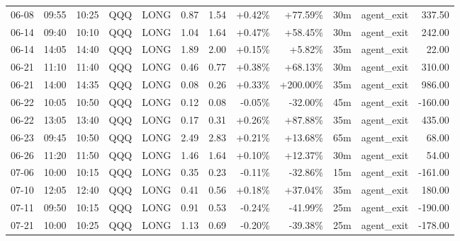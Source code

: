 \documentclass[11pt,a4paper,twoside]{article}
\begin{document}
\begin{center}
\begin{longtable}{>{\color{txtmain}}l l l l l r r r r r >{\color{txtmain}}l r}
06-08 & 09:55 & 10:25 & QQQ & LONG & 0.87 & 1.54 & \textcolor{wingreen}{+0.42\%} & \textcolor{wingreen}{+77.59\%} & 30m & agent\_exit & \textcolor{wingreen}{337.50} \\
06-14 & 09:40 & 10:10 & QQQ & LONG & 1.04 & 1.64 & \textcolor{wingreen}{+0.47\%} & \textcolor{wingreen}{+58.45\%} & 30m & agent\_exit & \textcolor{wingreen}{242.00} \\
06-14 & 14:05 & 14:40 & QQQ & LONG & 1.89 & 2.00 & \textcolor{wingreen}{+0.15\%} & \textcolor{wingreen}{+5.82\%} & 35m & agent\_exit & \textcolor{wingreen}{22.00} \\
06-21 & 11:10 & 11:40 & QQQ & LONG & 0.46 & 0.77 & \textcolor{wingreen}{+0.38\%} & \textcolor{wingreen}{+68.13\%} & 30m & agent\_exit & \textcolor{wingreen}{310.00} \\
06-21 & 14:00 & 14:35 & QQQ & LONG & 0.08 & 0.26 & \textcolor{wingreen}{+0.33\%} & \textcolor{wingreen}{+200.00\%} & 35m & agent\_exit & \textcolor{wingreen}{986.00} \\
06-22 & 10:05 & 10:50 & QQQ & LONG & 0.12 & 0.08 & \textcolor{lossred}{-0.05\%} & \textcolor{lossred}{-32.00\%} & 45m & agent\_exit & \textcolor{lossred}{-160.00} \\
06-22 & 13:05 & 13:40 & QQQ & LONG & 0.17 & 0.31 & \textcolor{wingreen}{+0.26\%} & \textcolor{wingreen}{+87.88\%} & 35m & agent\_exit & \textcolor{wingreen}{435.00} \\
06-23 & 09:45 & 10:50 & QQQ & LONG & 2.49 & 2.83 & \textcolor{wingreen}{+0.21\%} & \textcolor{wingreen}{+13.68\%} & 65m & agent\_exit & \textcolor{wingreen}{68.00} \\
06-26 & 11:20 & 11:50 & QQQ & LONG & 1.46 & 1.64 & \textcolor{wingreen}{+0.10\%} & \textcolor{wingreen}{+12.37\%} & 30m & agent\_exit & \textcolor{wingreen}{54.00} \\
07-06 & 10:00 & 10:15 & QQQ & LONG & 0.35 & 0.23 & \textcolor{lossred}{-0.11\%} & \textcolor{lossred}{-32.86\%} & 15m & agent\_exit & \textcolor{lossred}{-161.00} \\
07-10 & 12:05 & 12:40 & QQQ & LONG & 0.41 & 0.56 & \textcolor{wingreen}{+0.18\%} & \textcolor{wingreen}{+37.04\%} & 35m & agent\_exit & \textcolor{wingreen}{180.00} \\
07-11 & 09:50 & 10:15 & QQQ & LONG & 0.91 & 0.53 & \textcolor{lossred}{-0.24\%} & \textcolor{lossred}{-41.99\%} & 25m & agent\_exit & \textcolor{lossred}{-190.00} \\
07-21 & 10:00 & 10:25 & QQQ & LONG & 1.13 & 0.69 & \textcolor{lossred}{-0.20\%} & \textcolor{lossred}{-39.38\%} & 25m & agent\_exit & \textcolor{lossred}{-178.00} \\

\end{longtable}
\end{center}
\end{document}
